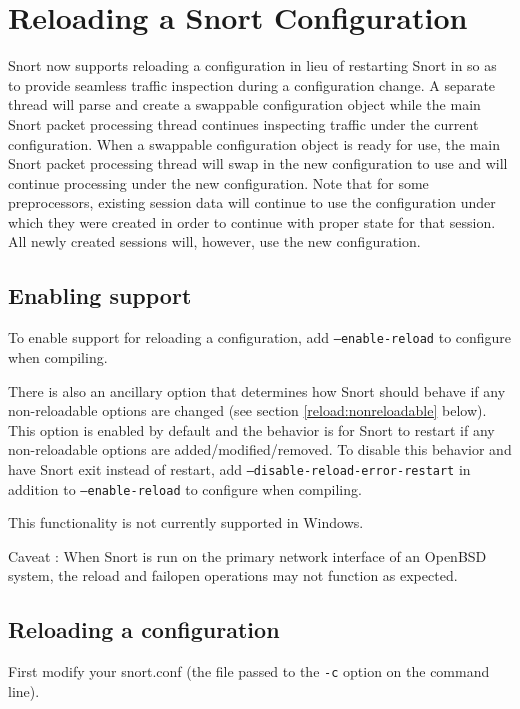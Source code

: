 \documentclass[english]{report}
\newenvironment{note}{
\samepage
    \vspace{10pt}{\textsf{
        {\hspace{7pt}\Huge{$\triangle$\hspace{-12.5pt}{\Large{$^!$}}}}\hspace{5pt}
        {\Large{NOTE}}
    }
    }
   \begin{center}
    \par\vspace{-17pt}

    \begin{lrbox}{\savepar}
    \begin{minipage}[r]{6in}
}
{
    \end{minipage}
    \end{lrbox}
    \fbox{
        \usebox{
            \savepar
	}
    }
    \par\vskip10pt
    \end{center}
}
\newenvironment{note}{
        \begin{rawhtml}
        <p><table border="1"><tr><td><b>
        Note:&nbsp;&nbsp;</b>
        \end{rawhtml}
}{
        \begin{rawhtml}
        </b></td></tr></table></p>
        \end{rawhtml}
}
\begin{document}
\section{Reloading a Snort Configuration}

Snort now supports reloading a configuration in lieu of restarting Snort in
so as to provide seamless traffic inspection during a configuration change.
A separate thread will parse and create a swappable configuration object while
the main Snort packet processing thread continues inspecting traffic under the
current configuration.  When a swappable configuration object is ready for use,
the main Snort packet processing thread will swap in the new configuration to
use and will continue processing under the new configuration.  Note that for
some preprocessors, existing session data will continue to use the configuration
under which they were created in order to continue with proper state for that
session.  All newly created sessions will, however, use the new configuration.


\subsection{Enabling support}
\label{reload:enable}
To enable support for reloading a configuration, add \texttt{--enable-reload} to
configure when compiling.

There is also an ancillary option that determines how Snort should behave
if any non-reloadable options are changed (see section \ref{reload:nonreloadable} below).
This option is enabled by default and the behavior is for
Snort to restart if any non-reloadable options are added/modified/removed.
To disable this behavior and have Snort exit instead of restart, add
\texttt{--disable-reload-error-restart} in addition to \texttt{--enable-reload} to configure
when compiling.

\begin{note}
This functionality is not currently supported in Windows.

Caveat : When Snort is run on the primary network interface of an OpenBSD system, the reload and failopen operations may not function as expected.

\end{note}


\subsection{Reloading a configuration}
\label{reload:reload}
First modify your snort.conf (the file passed to the \texttt{-c} option on the
command line).
\end{document}
